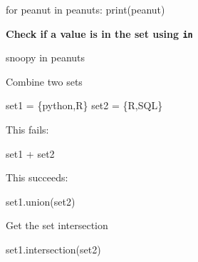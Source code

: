 \documentclass[
  letterpaper,
  DIV=11,
  numbers=noendperiod]{scrreprt}
\newenvironment{Shaded}{\begin{snugshade}}{\end{snugshade}}
\newcommand{\BuiltInTok}[1]{\textcolor[rgb]{0.00,0.23,0.31}{#1}}
\newcommand{\CommentTok}[1]{\textcolor[rgb]{0.37,0.37,0.37}{#1}}
\newcommand{\ControlFlowTok}[1]{\textcolor[rgb]{0.00,0.23,0.31}{#1}}
\newcommand{\KeywordTok}[1]{\textcolor[rgb]{0.00,0.23,0.31}{#1}}
\newcommand{\NormalTok}[1]{\textcolor[rgb]{0.00,0.23,0.31}{#1}}
\newcommand{\OperatorTok}[1]{\textcolor[rgb]{0.37,0.37,0.37}{#1}}
\newcommand{\StringTok}[1]{\textcolor[rgb]{0.13,0.47,0.30}{#1}}
\begin{document}
\begin{Shaded}
\begin{Highlighting}[]
\ControlFlowTok{for}\NormalTok{ peanut }\KeywordTok{in}\NormalTok{ peanuts:}
    \BuiltInTok{print}\NormalTok{(peanut)}
\end{Highlighting}
\end{Shaded}

\textbf{Check if a value is in the set using \texttt{in}}

\begin{Shaded}
\begin{Highlighting}[]
\CommentTok{\textquotesingle{}snoopy\textquotesingle{}} \KeywordTok{in}\NormalTok{ peanuts}
\end{Highlighting}
\end{Shaded}

Combine two sets

\begin{Shaded}
\begin{Highlighting}[]
\NormalTok{set1 }\OperatorTok{=}\NormalTok{ \{}\StringTok{\textquotesingle{}python\textquotesingle{}}\NormalTok{,}\StringTok{\textquotesingle{}R\textquotesingle{}}\NormalTok{\}}
\NormalTok{set2 }\OperatorTok{=}\NormalTok{ \{}\StringTok{\textquotesingle{}R\textquotesingle{}}\NormalTok{,}\StringTok{\textquotesingle{}SQL\textquotesingle{}}\NormalTok{\}}
\end{Highlighting}
\end{Shaded}

This fails:

\begin{Shaded}
\begin{Highlighting}[]
\NormalTok{set1 }\OperatorTok{+}\NormalTok{ set2}
\end{Highlighting}
\end{Shaded}

This succeeds:

\begin{Shaded}
\begin{Highlighting}[]
\NormalTok{set1.union(set2)}
\end{Highlighting}
\end{Shaded}

Get the set intersection

\begin{Shaded}
\begin{Highlighting}[]
\NormalTok{set1.intersection(set2)}
\end{Highlighting}
\end{Shaded}
\end{document}
